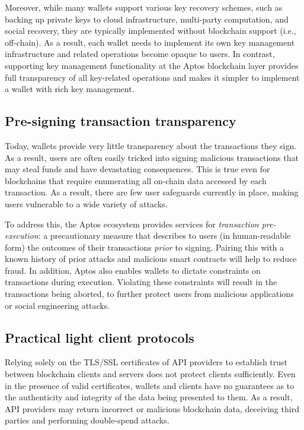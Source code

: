 \documentclass{article}
\begin{document}
Moreover, while many wallets support various key recovery schemes, such as backing up private keys to cloud infrastructure, multi-party computation, and social recovery, they are typically implemented without blockchain support (i.e., off-chain). As a result, each wallet needs to implement its own key management infrastructure and related operations become opaque to users. In contrast, supporting key management functionality at the Aptos blockchain layer provides full transparency of all key-related operations and makes it simpler to implement a wallet with rich key management.

\subsection{Pre-signing transaction transparency}

Today, wallets provide very little transparency about the transactions they sign. As a result, users are often easily tricked into signing malicious transactions that may steal funds and have devastating consequences. This is true even for blockchains that require enumerating all on-chain data accessed by each transaction. As a result, there are few user safeguards currently in place, making users vulnerable to a wide variety of attacks. 

To address this, the Aptos ecosystem provides services for \emph{transaction pre-execution}: a precautionary measure that describes to users (in human-readable form) the outcomes of their transactions \emph{prior} to signing. Pairing this with a known history of prior attacks and malicious smart contracts will help to reduce fraud. In addition, Aptos also enables wallets to dictate constraints on transactions during execution. Violating these constraints will result in the transactions being aborted, to further protect users from malicious applications or social engineering attacks.

\subsection{Practical light client protocols}
Relying solely on the TLS/SSL certificates of API providers to establish trust between blockchain clients and servers does not protect clients sufficiently. Even in the presence of valid certificates, wallets and clients have no guarantees as to the authenticity and integrity of the data being presented to them. As a result, API providers may return incorrect or malicious blockchain data, deceiving third parties and performing double-spend attacks.
\end{document}
